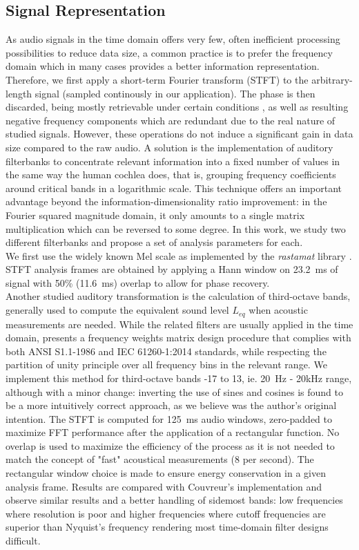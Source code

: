 \documentclass[preprint,12pt]{elsarticle}
\begin{document}
\subsection{Signal Representation}
As audio signals in the time domain offers very few, often inefficient processing possibilities to reduce data size, a common practice is to prefer the frequency domain which in many cases provides a better information representation. Therefore, we first apply a short-term Fourier transform (STFT) to the arbitrary-length signal (sampled continously in our application). The phase is then discarded, being mostly retrievable under certain conditions \cite{nawab1983}, as well as resulting negative frequency components which are redundant due to the real nature of studied signals. However, these operations do not induce a significant gain in data size compared to the raw audio. A solution is the implementation of auditory filterbanks to concentrate relevant information into a fixed number of values in the same way the human cochlea does, that is, grouping frequency coefficients around critical bands in a logarithmic scale. This technique offers an important advantage beyond the information-dimensionality ratio improvement: in the Fourier squared magnitude domain, it only amounts to a single matrix multiplication which can be reversed to some degree. In this work, we study two different filterbanks and propose a set of analysis parameters for each.\\

We first use the widely known Mel scale as implemented by the \textit{rastamat} library \cite{ellis2005}. STFT analysis frames are obtained by applying a Hann window on 23.2~ms of signal with 50\% (11.6~ms) overlap to allow for phase recovery.\\

Another studied auditory transformation is the calculation of third-octave bands, generally used to compute the equivalent sound level $L_{eq}$ when acoustic measurements are needed. While the related filters are usually applied in the time domain, \cite{antoni2010} presents a frequency weights matrix design procedure that complies with both ANSI S1.1-1986 and IEC 61260-1:2014 standards, while respecting the partition of unity principle over all frequency bins in the relevant range. We implement this method for third-octave bands -17 to 13, ie. 20~Hz - 20kHz range, although with a minor change: inverting the use of sines and cosines is found to be a more intuitively correct approach, as we believe was the author's original intention. The STFT is computed for 125~ms audio windows, zero-padded to maximize FFT performance after the application of a rectangular function. No overlap is used to maximize the efficiency of the process as it is not needed to match the concept of "fast" acoustical measurements (8 per second). The rectangular window choice is made to ensure energy conservation in a given analysis frame. Results are compared with Couvreur's implementation \cite{couvreur} and observe similar results and a better handling of sidemost bands: low frequencies where resolution is poor and higher frequencies where cutoff frequencies are superior than Nyquist's frequency rendering most time-domain filter designs difficult.\\
\end{document}
